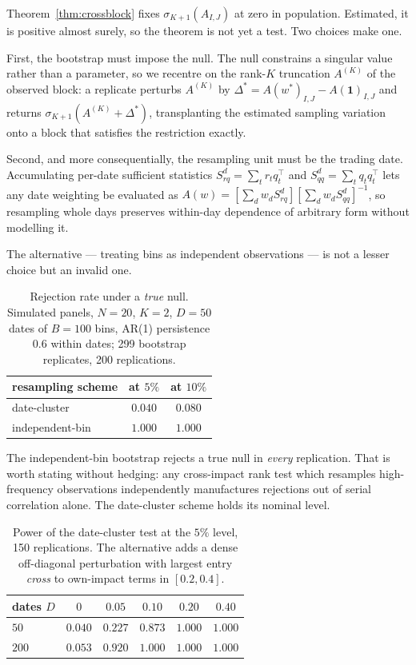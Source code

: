 \documentclass[10pt,twocolumn]{article}
\theoremstyle{remark}
\begin{document}
Theorem~\ref{thm:crossblock} fixes $\sigma_{K+1}(A_{I,J})$ at zero in
population. Estimated, it is positive almost surely, so the theorem is not yet
a test. Two choices make one.

First, the bootstrap must impose the null. The null constrains a singular value
rather than a parameter, so we recentre on the rank-$K$ truncation $A^{(K)}$ of
the observed block: a replicate perturbs $A^{(K)}$ by
$\Delta^\ast=A(w^\ast)_{I,J}-A(\mathbf1)_{I,J}$ and returns
$\sigma_{K+1}(A^{(K)}+\Delta^\ast)$, transplanting the estimated sampling
variation onto a block that satisfies the restriction exactly.

Second, and more consequentially, the resampling unit must be the trading date.
Accumulating per-date sufficient statistics $S^d_{rq}=\sum_tr_tq_t^\top$ and
$S^d_{qq}=\sum_tq_tq_t^\top$ lets any date weighting be evaluated as
$A(w)=[\sum_dw_dS^d_{rq}][\sum_dw_dS^d_{qq}]^{-1}$, so resampling whole days
preserves within-day dependence of arbitrary form without modelling it.

The alternative --- treating bins as independent observations --- is not a
lesser choice but an invalid one.

\begin{table}[t]
\centering
\small
\caption{Rejection rate under a \emph{true} null. Simulated panels, $N=20$,
$K=2$, $D=50$ dates of $B=100$ bins, AR(1) persistence $0.6$ within dates; 299
bootstrap replicates, 200 replications.}
\label{tab:xbsize}
\begin{tabular}{lcc}
\toprule
resampling scheme & at $5\%$ & at $10\%$ \\
\midrule
date-cluster & $0.040$ & $0.080$ \\
independent-bin & $1.000$ & $1.000$ \\
\bottomrule
\end{tabular}
\end{table}

The independent-bin bootstrap rejects a true null in \emph{every} replication.
That is worth stating without hedging: any cross-impact rank test which
resamples high-frequency observations independently manufactures rejections out
of serial correlation alone. The date-cluster scheme holds its nominal level.

\begin{table}[t]
\centering
\small
\caption{Power of the date-cluster test at the $5\%$ level, 150 replications.
The alternative adds a dense off-diagonal perturbation with largest entry
\emph{cross} to own-impact terms in $[0.2,0.4]$.}
\label{tab:xbpower}
\begin{tabular}{lccccc}
\toprule
dates $D$ & $0$ & $0.05$ & $0.10$ & $0.20$ & $0.40$ \\
\midrule
$50$ & $0.040$ & $0.227$ & $0.873$ & $1.000$ & $1.000$ \\
$200$ & $0.053$ & $0.920$ & $1.000$ & $1.000$ & $1.000$ \\
\bottomrule
\end{tabular}
\end{table}
\end{document}
